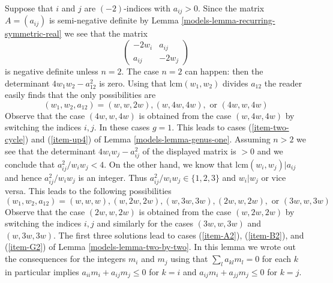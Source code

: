 \medskip\noindent
Suppose that $i$ and $j$ are $(-2)$-indices with $a_{ij} > 0$.
Since the matrix $A = (a_{ij})$ is semi-negative definite by
Lemma \ref{models-lemma-recurring-symmetric-real} we see that the matrix
$$
\left(
\begin{matrix}
-2w_i & a_{ij} \\
a_{ij} & -2w_j
\end{matrix}
\right)
$$
is negative definite unless $n = 2$. The case $n = 2$ can happen: then
the determinant $4w_1w_2 - a_{12}^2$ is zero. Using that
$\text{lcm}(w_1, w_2)$ divides $a_{12}$ the reader easily finds
that the only possibilities are
$$
(w_1, w_2, a_{12}) = (w, w, 2w), (w, 4w, 4w), \text{ or }(4w, w, 4w)
$$
Observe that the case $(4w, w, 4w)$ is obtained from the case
$(w, 4w, 4w)$ by switching the indices $i, j$.
In these cases $g = 1$. This leads to cases
(\ref{item-two-cycle}) and (\ref{item-up4}) of Lemma \ref{models-lemma-genus-one}.
Assuming $n > 2$ we see
that the determinant $4w_iw_j - a_{ij}^2$ of the displayed matrix
is $> 0$ and we conclude that $a_{ij}^2/w_iw_j < 4$.
On the other hand, we know that $\text{lcm}(w_i, w_j) | a_{ij}$
and hence $a_{ij}^2/w_iw_j$ is an integer.
Thus $a_{ij}^2/w_iw_j \in \{1, 2, 3\}$ and $w_i | w_j$ or
vice versa. This leads to the following possibilities
$$
(w_1, w_2, a_{12}) = (w, w, w), (w, 2w, 2w), (w, 3w, 3w),
(2w, w, 2w), \text{ or }(3w, w, 3w)
$$
Observe that the case $(2w, w, 2w)$ is obtained from the case
$(w, 2w, 2w)$ by switching the indices $i, j$ and similarly
for the cases $(3w, w, 3w)$ and $(w, 3w, 3w)$. The first three
solutions lead to cases (\ref{item-A2}), (\ref{item-B2}), and
(\ref{item-G2}) of Lemma \ref{models-lemma-two-by-two}. In this lemma
we wrote out the consequences for the integers $m_i$ and $m_j$
using that $\sum_l a_{kl}m_l = 0$ for each $k$ in particular implies
$a_{ii}m_i + a_{ij}m_j \leq 0$ for $k = i$ and
$a_{ij}m_i + a_{jj}m_j \leq 0$ for $k = j$.

